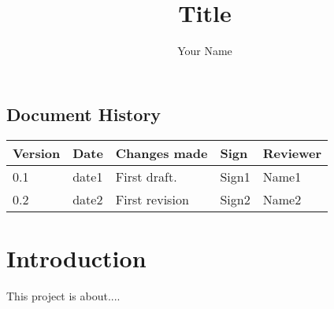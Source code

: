 \documentclass[10pt,a4paper, english,oneside]{article}
\begin{document}
\title{Title}
\author{Your Name}
 
 
\maketitle
\makeprojectid
\makestafflist
\subsection*{Document History}
\begin{tabular}{|l|l|p{4.9cm}|l|l|} 
\hline
Version & Date & Changes made & Sign & Reviewer\\
\hline
\hline
0.1 & date1 & First draft. & Sign1 & Name1   \\
\hline
0.2 & date2 & First revision & Sign2 & Name2   \\
\hline
\end{tabular}
\makeindexandmore

\section{Introduction}
This project is about....
\end{document}

